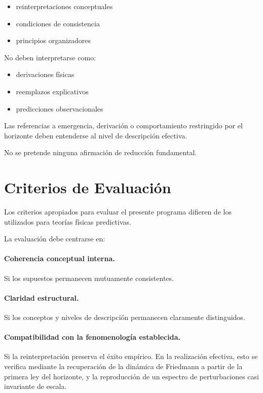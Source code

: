 \documentclass[12pt,a4paper]{article}
\begin{document}
\begin{itemize}
  \item reinterpretaciones conceptuales
  \item condiciones de consistencia
  \item principios organizadores
\end{itemize}

No deben interpretarse como:

\begin{itemize}
  \item derivaciones físicas
  \item reemplazos explicativos
  \item predicciones observacionales
\end{itemize}

Las referencias a emergencia, derivación o comportamiento restringido por el horizonte deben entenderse al nivel de descripción efectiva.

No se pretende ninguna afirmación de reducción fundamental.

\section{Criterios de Evaluación}

Los criterios apropiados para evaluar el presente programa difieren de los utilizados para teorías físicas predictivas.

La evaluación debe centrarse en:

\paragraph{Coherencia conceptual interna.} Si los supuestos permanecen mutuamente consistentes.

\paragraph{Claridad estructural.} Si los conceptos y niveles de descripción permanecen claramente distinguidos.

\paragraph{Compatibilidad con la fenomenología establecida.} Si la reinterpretación preserva el éxito empírico. En la realización efectiva, esto se verifica mediante la recuperación de la dinámica de Friedmann a partir de la primera ley del horizonte, y la reproducción de un espectro de perturbaciones casi invariante de escala.
\end{document}
